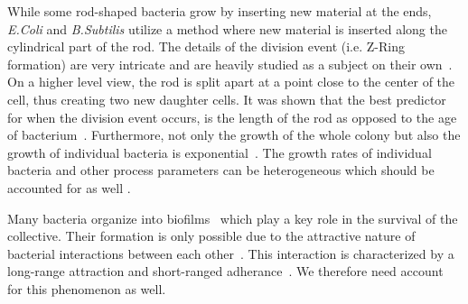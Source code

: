 \documentclass{article}
\begin{document}
While some rod-shaped bacteria grow by inserting new material at the ends, \textit{E.Coli} and
\textit{B.Subtilis} utilize a method where new material is inserted along the cylindrical part of
the rod. The details of the division event (i.e. Z-Ring formation) are very intricate and are heavily
studied as a subject on their own~\cite{Harry2001}.
On a higher level view, the rod is split apart at a point close to the center of the cell, thus
creating two new daughter cells.
It was shown that the best predictor for when the division event occurs, is the length of the rod as
opposed to the age of bacterium~\cite{Robert2014}.
Furthermore, not only the growth of the whole colony but also the growth of individual bacteria is
exponential~\cite{Amir2014,Takeuchi2005}.
The growth rates of individual bacteria and other process parameters can be heterogeneous which
should be accounted for as well \cite{Koutsoumanis2013}.

Many bacteria organize into biofilms~\cite{Dunne2002,Ong1999} which play a key role in the survival
of the collective.
Their formation is only possible due to the attractive nature of bacterial interactions between
each other~\cite{Berne2018}.
This interaction is characterized by a long-range attraction and short-ranged
adherance~\cite{Verwey1947,Trejo2013}.
We therefore need account for this phenomenon as well.
\end{document}
